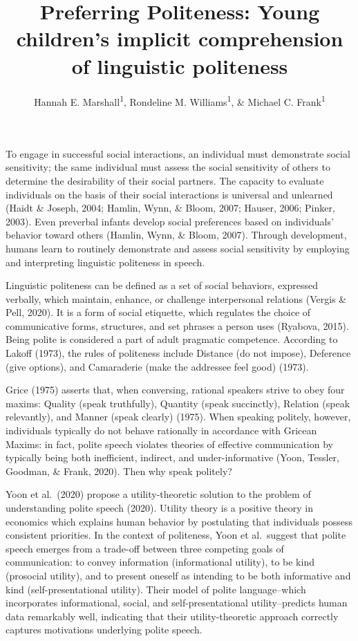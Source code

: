 \documentclass[
  english,
  man,floatsintext]{apa6}
\title{Preferring Politeness: Young children's implicit comprehension of linguistic politeness}
\author{Hannah E. Marshall\textsuperscript{1}, Rondeline M. Williams\textsuperscript{1}, \& Michael C. Frank\textsuperscript{1}}
\date{}
\affiliation{\vspace{0.5cm}\textsuperscript{1} Stanford University}
\begin{document}
\maketitle

To engage in successful social interactions, an individual must demonstrate social sensitivity; the same individual must assess the social sensitivity of others to determine the desirability of their social partners. The capacity to evaluate individuals on the basis of their social interactions is universal and unlearned (Haidt \& Joseph, 2004; Hamlin, Wynn, \& Bloom, 2007; Hauser, 2006; Pinker, 2003). Even preverbal infants develop social preferences based on individuals' behavior toward others (Hamlin, Wynn, \& Bloom, 2007). Through development, humans learn to routinely demonstrate and assess social sensitivity by employing and interpreting linguistic politeness in speech.

Linguistic politeness can be defined as a set of social behaviors, expressed verbally, which maintain, enhance, or challenge interpersonal relations (Vergis \& Pell, 2020). It is a form of social etiquette, which regulates the choice of communicative forms, structures, and set phrases a person uses (Ryabova, 2015). Being polite is considered a part of adult pragmatic competence. According to Lakoff (1973), the rules of politeness include Distance (do not impose), Deference (give options), and Camaraderie (make the addressee feel good) (1973).

Grice (1975) asserts that, when conversing, rational speakers strive to obey four maxims: Quality (speak truthfully), Quantity (speak succinctly), Relation (speak relevantly), and Manner (speak clearly) (1975). When speaking politely, however, individuals typically do not behave rationally in accordance with Gricean Maxims: in fact, polite speech violates theories of effective communication by typically being both inefficient, indirect, and under-informative (Yoon, Tessler, Goodman, \& Frank, 2020). Then why speak politely?

Yoon et al.~(2020) propose a utility-theoretic solution to the problem of understanding polite speech (2020). Utility theory is a positive theory in economics which explains human behavior by postulating that individuals possess consistent priorities. In the context of politeness, Yoon et al.~suggest that polite speech emerges from a trade-off between three competing goals of communication: to convey information (informational utility), to be kind (prosocial utility), and to present oneself as intending to be both informative and kind (self-presentational utility). Their model of polite language--which incorporates informational, social, and self-presentational utility--predicts human data remarkably well, indicating that their utility-theoretic approach correctly captures motivations underlying polite speech.
\end{document}
